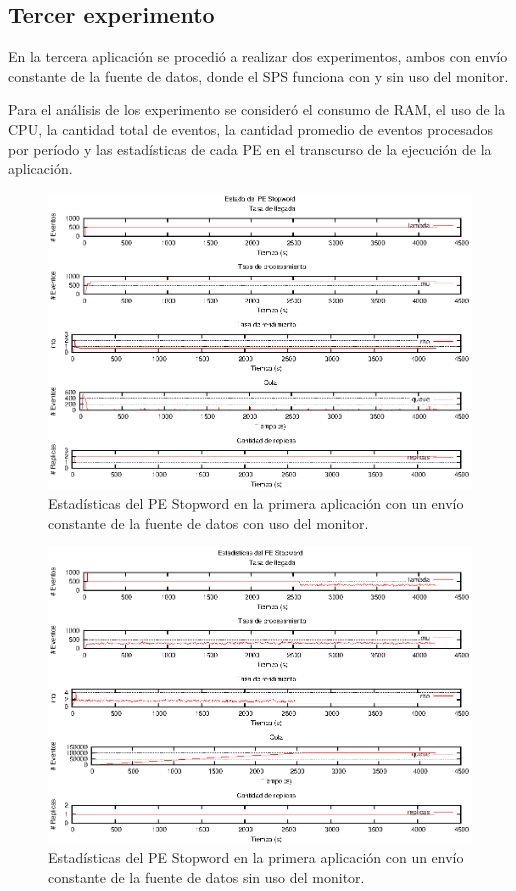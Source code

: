 \subsection{Tercer experimento}
En la tercera aplicación se procedió a realizar dos experimentos, ambos con envío constante de la fuente de datos, donde el SPS funciona con y sin uso del monitor.

Para el análisis de los experimento se consideró el consumo de RAM, el uso de la CPU, la cantidad total de eventos, la cantidad promedio de eventos procesados por período y las estadísticas de cada PE en el transcurso de la ejecución de la aplicación.

\begin{figure}[p]
\centering
    \includegraphics[scale=1.1]{images/exp/app1/uniform/cm/statusStopwordPE.eps}
    \caption{Estadísticas del PE Stopword en la primera aplicación con un envío constante de la fuente de datos con uso del monitor.}
    \label{fig:app1-uniform-statusStopwordPE-cm}
\end{figure}

\begin{figure}[p]
\centering
    \includegraphics[scale=1.1]{images/exp/app1/uniform/sm/statusStopwordPE.eps}
    \caption{Estadísticas del PE Stopword en la primera aplicación con un envío constante de la fuente de datos sin uso del monitor.}
    \label{fig:app1-uniform-statusStopwordPE-sm}
\end{figure}

